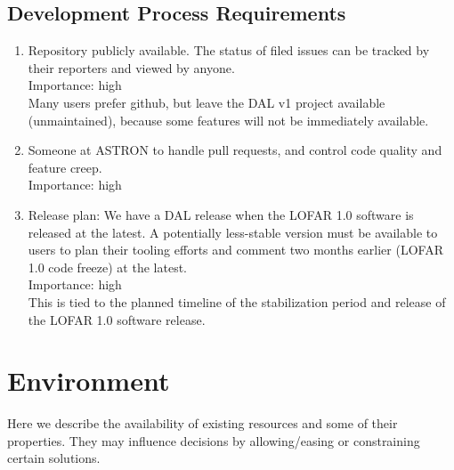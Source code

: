 \documentclass[a4paper,11pt]{article}
\begin{document}
\subsection{Development Process Requirements} \label{sec:dev_process_reqs}
\begin{enumerate}[resume, label=\it R.\arabic{*}]
\itemsep0em

\item \label{req:repos} Repository publicly available. 
The status of filed issues can be tracked by their reporters and viewed by anyone.\\
Importance: high\\
Many users prefer github, but leave the DAL v1 project available (unmaintained), because some features will not be immediately available.\\

\item \label{req:maintainer} Someone at ASTRON to handle pull requests, and control code quality and feature creep.\\
Importance: high\\

\item \label{req:release} Release plan: We have a DAL release when the LOFAR 1.0 software is released at the latest.
A potentially less-stable version must be available to users to plan their tooling efforts and comment two months earlier (LOFAR 1.0 code freeze) at the latest.\\
Importance: high\\
This is tied to the planned timeline of the stabilization period and release of the LOFAR 1.0 software release.

\end{enumerate}



\section{Environment} \label{sec:env}

Here we describe the availability of existing resources and some of their properties.
They may influence decisions by allowing/easing or constraining certain solutions.
\end{document}
